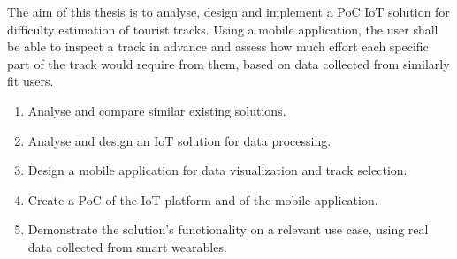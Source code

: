 The aim of this thesis is to analyse, design and implement a PoC IoT solution for difficulty estimation of tourist tracks.
Using a mobile application, the user shall be able to inspect a track in advance and assess how much effort each specific part of the track would require from them, based on data collected from similarly fit users.
\begin{enumerate}
    \item Analyse and compare similar existing solutions.
    \item Analyse and design an IoT solution for data processing.
    \item Design a mobile application for data visualization and track selection.
    \item Create a PoC of the IoT platform and of the mobile application.
    \item Demonstrate the solution's functionality on a relevant use case, using real data collected from smart wearables.
\end{enumerate}
